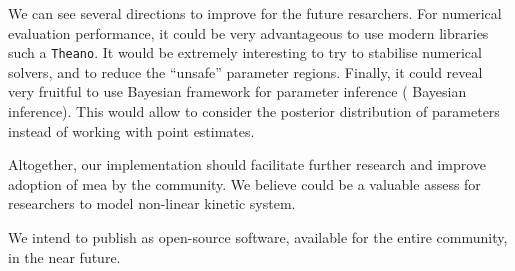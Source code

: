 We can see several directions to improve \means{} for the future resarchers.
For numerical evaluation performance, it could be very
advantageous to use modern libraries such a \texttt{Theano}\cite{bergstra_theano:_2010}.
It would be extremely interesting to try to stabilise numerical solvers, and to reduce the ``unsafe'' parameter regions.
Finally, it could reveal very fruitful to use Bayesian framework for parameter inference (\ie{} Bayesian inference).
This would allow to consider the posterior distribution of parameters instead of working with point estimates.

Altogether, our implementation should facilitate further research and improve adoption of \acrlong{mea} by the community.
We believe \means{} could be a valuable assess for researchers to model non-linear kinetic system.

 
We intend to publish \means as open-source software, available for the entire community, in the near future. 

